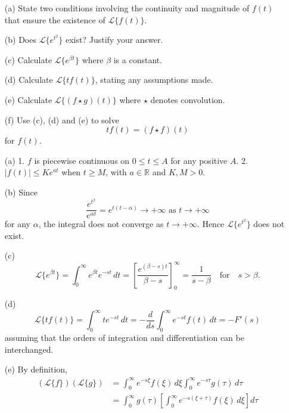 \documentclass[10pt,landscape]{article}
\begin{document}
\begin{multicols}{2}
\begin{enumerate}
\item[(a)] State two conditions involving the continuity and magnitude of \( f(t) \) that ensure the
existence of \( \mathcal{L} \{ f(t) \} \). 
\item[(b)] Does \( \mathcal{L} \{ e^{t^2} \} \) exist? Justify your answer.
\item[(c)] Calculate \( \mathcal{L} \{ e^{\beta t} \} \) where \( \beta \) is a constant.   
\item[(d)] Calculate \( \mathcal{L} \{ t f(t) \} \), stating any assumptions made.  
\item[(e)] Calculate \( \mathcal{L} \{ (f \star g)(t) \} \) where \( \star \) denotes convolution. 
\item[(f)] Use (c), (d) and (e) to solve\\
\[
t f(t) = (f \star f)(t)
\]
for \( f(t) \).
\end{enumerate}
\begin{enumerate}


\item[(a)] 1. \( f \) is piecewise continuous on \( 0 \le t \le A \) for any positive \( A \).  
2. \( |f(t)| \le K e^{at} \) when \( t \ge M \), with \( a \in \mathbb{R} \) and \( K, M > 0 \).  

\item[(b)] Since
\[
\frac{e^{t^2}}{e^{\alpha t}} = e^{t(t - \alpha)} \to +\infty \text{ as } t \to +\infty
\]
for any \( \alpha \), the integral does not converge as \( t \to +\infty \). Hence \( \mathcal{L} \{ e^{t^2} \} \) does not exist.  

\item[(c)]
\[
\mathcal{L} \{ e^{\beta t} \} = \int_0^\infty e^{\beta t} e^{-st} \, dt = \left[ \frac{e^{(\beta - s)t}}{\beta - s} \right]^\infty_0 = \frac{1}{s - \beta} \quad \text{for} \quad s > \beta.  
\]
\item[(d)]
\[
\mathcal{L} \{ t f(t) \} = \int_0^\infty t e^{-st} \, dt = -\frac{d}{ds} \int_0^\infty e^{-st} f(t) \, dt = -F'(s)
\]
assuming that the orders of integration and differentiation can be interchanged.  

\item[(e)] By definition,
\begin{align*}
(\mathcal{L}\{ f \})(\mathcal{L}\{ g \}) &= \int_0^\infty e^{-s\xi} f(\xi) \, d\xi \int_0^\infty e^{-s\tau} g(\tau) \, d\tau \\
&= \int_0^\infty g(\tau) \left[ \int_0^\infty e^{-s(\xi + \tau)} f(\xi) \, d\xi \right] d\tau
\end{align*}


\end{enumerate}
\end{multicols}
\end{document}
